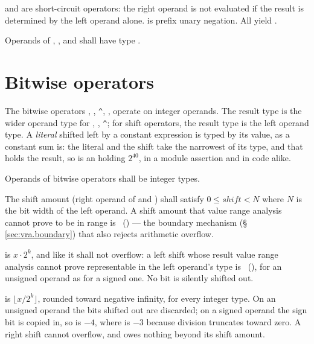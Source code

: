 \pnum
{} and  are short-circuit operators: the right operand
is not evaluated if the result is determined by the left operand alone.
\lain{!} is prefix unary negation.  All yield .

\begin{constraint}
  Operands of , , and \lain{!} shall have type
  .
\end{constraint}

\section{Bitwise operators}
\label{sec:expr.bitwise}

\pnum
The bitwise operators \lain{\&}, \lain{|}, \texttt{\textasciicircum}, \lain{<<}, \lain{>>}
operate on integer operands.  The result type is the wider operand type for
\lain{\&}, \lain{|}, \texttt{\textasciicircum}; for shift operators, the result type is
the left operand type.  A \emph{literal} shifted left by a constant expression is typed by its
value, as a constant sum is: the literal and the shift take the narrowest of its type,
 and  that holds the result, so  is an  holding
\(2^{40}\), in a module assertion and in code alike.

\begin{constraint}
  Operands of bitwise operators shall be integer types.
\end{constraint}

\begin{constraint}
  The shift amount (right operand of \lain{<<} and \lain{>>}) shall
  satisfy $0 \leq \mathit{shift} < N$ where $N$ is the bit width of the
  left operand.  A shift amount that value range analysis cannot prove to be
  in range is \illformed{}~() --- the boundary mechanism
  (\S\,\ref{sec:vra.boundary}) that also rejects arithmetic overflow.
\end{constraint}

\begin{constraint}
   is \(x \cdot 2^k\), and like \lain{*} it shall not overflow: a left shift whose
  result value range analysis cannot prove representable in the left operand's type is
  \illformed{}~(), for an unsigned operand as for a signed one.  No bit is
  silently shifted out.
\end{constraint}

\pnum
{} is \(\lfloor x / 2^k \rfloor\), rounded toward negative infinity, for every integer
type.  On an unsigned operand the bits shifted out are discarded; on a signed operand the sign bit
is copied in, so  is \(-4\), where  is \(-3\) because division truncates
toward zero.  A right shift cannot overflow, and owes nothing beyond its shift amount.

